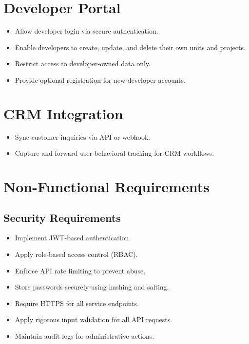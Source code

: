 \documentclass[12pt]{article}
\begin{document}
\section{Developer Portal}
\begin{itemize}
    \item Allow developer login via secure authentication.
    \item Enable developers to create, update, and delete their own units and projects.
    \item Restrict access to developer-owned data only.
    \item Provide optional registration for new developer accounts.
\end{itemize}

\section{CRM Integration}
\begin{itemize}
    \item Sync customer inquiries via API or webhook.
    \item Capture and forward user behavioral tracking for CRM workflows.
\end{itemize}

\section{Non-Functional Requirements}

\subsection{Security Requirements}
\begin{itemize}
    \item Implement JWT-based authentication.
    \item Apply role-based access control (RBAC).
    \item Enforce API rate limiting to prevent abuse.
    \item Store passwords securely using hashing and salting.
    \item Require HTTPS for all service endpoints.
    \item Apply rigorous input validation for all API requests.
    \item Maintain audit logs for administrative actions.
\end{itemize}
\end{document}
